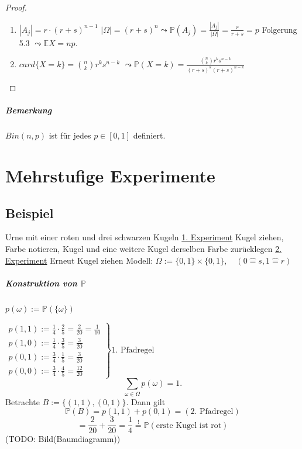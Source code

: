 \documentclass[a4paper,11pt,notitlepage]{report}
\newcommand{\Prim}{{\ensuremath{\mathbb{P}}}}
\newcommand{\E}{{\ensuremath{\mathbb{E}}}}
\begin{document}
\begin{proof}
\begin{enumerate}
	\item $|A_j|=r \cdot (r+s)^{n-1}$
		\newline
		$|\Omega| = (r+s)^n \leadsto \Prim(A_j) = \frac{|A_j|}{|\Omega|}= \frac{r}{r+s}=p$
		\newline
		Folgerung 5.3 $\leadsto \E X = np$.
	\item $card\{X=k\} = {n \choose k} r^k s^{n-k}$
		\newline
		$\leadsto \Prim(X=k)=\frac{{n \choose k} r^k s^{n-k}}{(r+s)^k (r+s)^{n-k}}$
\end{enumerate}
\end{proof}

\paragraph{Bemerkung}
$Bin(n,p)$ ist für jedes $p \in [0,1]$ definiert.

\chapter{Mehrstufige Experimente}
\section{Beispiel}
Urne mit einer roten und drei schwarzen Kugeln
\newline
\underline{1. Experiment} Kugel ziehen, Farbe notieren, Kugel und eine weitere Kugel derselben Farbe zurücklegen
\newline
\underline{2. Experiment} Erneut Kugel ziehen
\newline
Modell: $\Omega := \{0,1\} \times \{0,1\}, \quad (0 \hat{=} s, 1 \hat{=} r)$
\paragraph{Konstruktion von $\Prim$}
$p(\omega):= \Prim(\{\omega\})$

$\left.
\begin{array}{cc} %
p(1,1) := \frac{1}{4} \cdot \frac{2}{5} = \frac{2}{20} = \frac{1}{10}
 \\ p(1,0) := \frac{1}{4} \cdot \frac{3}{5} = \frac{3}{20} 
 \\ p(0,1) := \frac{3}{4} \cdot \frac{1}{5} = \frac{3}{20} 
 \\ p(0,0) := \frac{3}{4} \cdot \frac{4}{5} = \frac{12}{20}
\end{array}
\right\}
\text{1. Pfadregel}
$
$$\sum\limits_{\omega \in \Omega}{p(\omega)} = 1.$$
Betrachte $B:= \{(1,1),(0,1)\}$.
Dann gilt
$$\Prim(B) = p(1,1) + p(0,1) = (\text{2. Pfadregel})$$
$$= \frac{2}{20} + \frac{3}{20} = \frac{1}{4} \overset{!}{=} \Prim(\text{erste Kugel ist rot})$$
(TODO: Bild(Baumdiagramm))
\end{document}
